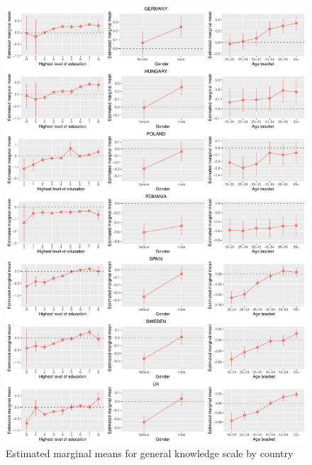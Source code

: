\documentclass[11pt,halfline,a4paper,]{ouparticle}
\begin{document}
\begin{figure}[!h]
\includegraphics[width=1\linewidth]{Revisiting-the-Measurement-and-Dimensionality-of-Political-Knowledge--Evidence-from-Seven-European-Countries_files/figure-latex/emmeans_plots3a-1} \caption{Estimated marginal means for general knowledge scale by country}\label{fig:emmeans_plots3a}
\end{figure}
\end{document}
